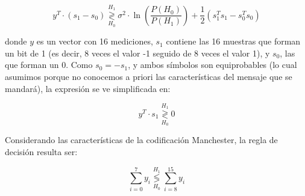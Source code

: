 \documentclass[main.tex]{subfiles}
\begin{document}
 \begin{equation}
 	y^{T} \cdot (s_1 - s_0) \underset{H_0}{\overset{H_1}{\gtrless}} 
 	\sigma^2 \cdot \ln{\left( \frac{P(H_0)}{P(H_1)} \right)}
 	+ \frac{1}{2} \left( s_1^T s_1 - s_0^T s_0\right)
 \end{equation}
 
 donde $y$ es un vector con 16 mediciones, $s_1$ contiene las 16 muestras que forman un bit de 1 (es decir, 8 veces el valor -1 seguido de 8 veces el valor 1), y $s_0$, las que forman un 0. Como $s_0 = -s_1$, y ambos s\'imbolos son equiprobables (lo cual asumimos porque no conocemos a priori las caracter\'isticas del mensaje que se mandar\'a), la expresi\'on se ve simplificada en:
 
 \begin{equation}
 	y^{T} \cdot s_1 \underset{H_0}{\overset{H_1}{\gtrless}} 0
 \end{equation}
 
Considerando las caracter\'isticas de la codificaci\'on Manchester, la regla de decisi\'on resulta ser:

\begin{equation}
	\sum_{i=0}^7 y_i \underset{H_0}{\overset{H_1}{\lessgtr}}
	\sum_{i=8}^{15} y_i
	\label{eq:bayes}
\end{equation} 
 
\end{document}
